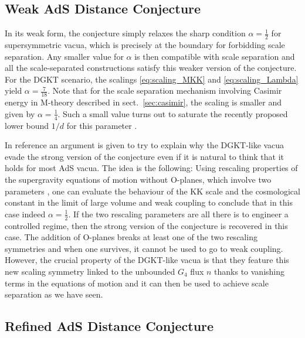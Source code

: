 \documentclass[11pt, a4paper]{article}
\newcommand{\half}{\frac{1}{2}}
\begin{document}
\subsection{Weak AdS Distance Conjecture}
\label{sec:weak}

In its weak form, the conjecture simply relaxes the sharp condition $\alpha=\half$ for supersymmetric vacua, which is precisely at the boundary for forbidding scale separation. Any smaller value for $\alpha$ is then compatible with scale separation and all the scale-separated constructions satisfy this weaker version of the conjecture. For the DGKT scenario, the scalings \eqref{eq:scaling_MKK} and \eqref{eq:scaling_Lambda} yield $\alpha=\frac{7}{18}$. Note that for the scale separation mechanism involving Casimir energy in M-theory described in sect.~\ref{sec:casimir}, the scaling is smaller and given by $\alpha=\frac{1}{4}$. Such a small value turns out to saturate the recently proposed lower bound $1/d$ for this parameter \cite{Rudelius:2021oaz,Castellano:2021mmx,Montero:2022prj}.

In reference \cite{Junghans:2020acz} an argument is given to try to explain why the DGKT-like vacua evade the strong version of the conjecture even if it is natural to think that it holds for most AdS vacua. The idea is the following: Using rescaling properties of the supergravity equations of motion without O-planes, which involve two parameters \cite{Witten:1985xb,Burgess:1985zz}, one can evaluate the behaviour of the KK scale and the cosmological constant in the limit of large volume and weak coupling to conclude that in this case indeed $\alpha=\half$. If the two rescaling parameters are all there is to engineer a controlled regime, then the strong version of the conjecture is recovered in this case. The addition of O-planes breaks at least one of the two rescaling symmetries and when one survives, it cannot be used to go to weak coupling. However, the crucial property of the DGKT-like vacua is that they feature this new scaling symmetry linked to the unbounded $G_4$ flux $n$ thanks to vanishing terms in the equations of motion and it can then be used to achieve scale separation as we have seen.

\subsection{Refined AdS Distance Conjecture}
\end{document}
